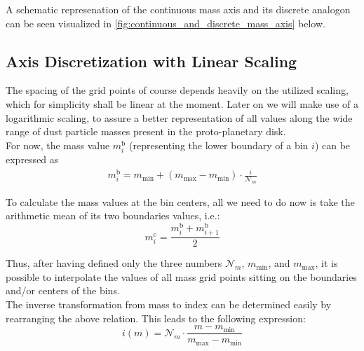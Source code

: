     A schematic represenation of the continuous mass axis and its discrete analogon can be seen 
    visualized in \cref{fig:continuous_and_discrete_mass_axis} below.

    

    \subsection{Axis Discretization with Linear Scaling}

        The spacing of the grid points of course depends heavily on the utilized scaling, which for 
        simplicity shall be linear at the moment. Later on we will make use of a logarithmic scaling,
        to assure a better representation of all values along the wide range of dust particle masses 
        present in the proto-planetary disk.\\
    
        For now, the mass value $m_i^\text{b}$ (representing the lower boundary of a bin $i$) can be 
        expressed as
        \begin{align}
          m_i^\text{b}=m_\text{min}+(m_\text{max}-m_\text{min})\cdot\frac{i}{\mathcal N_m}
        \end{align}
    
        To calculate the mass values at the bin centers, all we need to do now is take the arithmetic 
        mean of its two boundaries values, i.e.:
        \begin{equation}
            m_i^\text{c}
                =\frac{m_i^\text{b}+m_{i+1}^\text{b}}{2}
        \end{equation}
        
        Thus, after having defined only the three numbers $\mathcal N_m$, $m_\text{min}$, and 
        $m_\text{max}$, it is possible to interpolate the values of all mass grid points sitting on the 
        boundaries and/or centers of the bins.\\
        
        The inverse transformation from mass to index can be determined easily by rearranging the above 
        relation. This leads to the following expression:
        \begin{equation}
            i(m)
                =\mathcal N_m\cdot\frac{m-m_\text{min}}{m_\text{max}-m_\text{min}}
        \end{equation}
        
